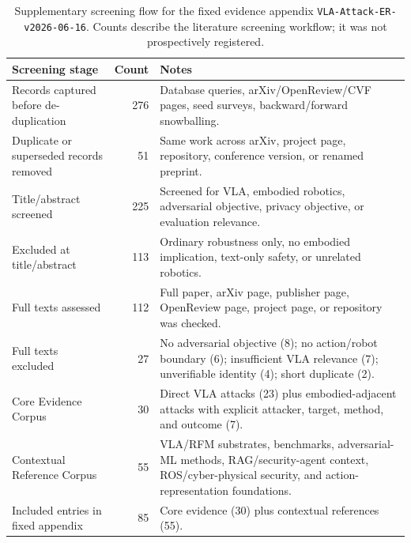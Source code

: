 \begin{table}[t]
\centering
\footnotesize
\caption{Supplementary screening flow for the fixed evidence appendix \texttt{VLA-Attack-ER-v2026-06-16}. Counts describe the literature screening workflow; it was not prospectively registered.}
\label{tab:review-flow}
\renewcommand{\arraystretch}{1.08}
\setlength{\tabcolsep}{3pt}
\begin{tabularx}{\columnwidth}{@{}p{}rY@{}}
\toprule
\textbf{Screening stage} & \textbf{Count} & \textbf{Notes} \\
\midrule
Records captured before de-duplication & 276 & Database queries, arXiv/OpenReview/CVF pages, seed surveys, backward/forward snowballing. \\
Duplicate or superseded records removed & 51 & Same work across arXiv, project page, repository, conference version, or renamed preprint. \\
Title/abstract screened & 225 & Screened for VLA, embodied robotics, adversarial objective, privacy objective, or evaluation relevance. \\
Excluded at title/abstract & 113 & Ordinary robustness only, no embodied implication, text-only safety, or unrelated robotics. \\
Full texts assessed & 112 & Full paper, arXiv page, publisher page, OpenReview page, project page, or repository was checked. \\
Full texts excluded & 27 & No adversarial objective (8); no action/robot boundary (6); insufficient VLA relevance (7); unverifiable identity (4); short duplicate (2). \\
Core Evidence Corpus & 30 & Direct VLA attacks (23) plus embodied-adjacent attacks with explicit attacker, target, method, and outcome (7). \\
Contextual Reference Corpus & 55 & VLA/RFM substrates, benchmarks, adversarial-ML methods, RAG/security-agent context, ROS/cyber-physical security, and action-representation foundations. \\
Included entries in fixed appendix & 85 & Core evidence (30) plus contextual references (55). \\
\bottomrule
\end{tabularx}
\end{table}
